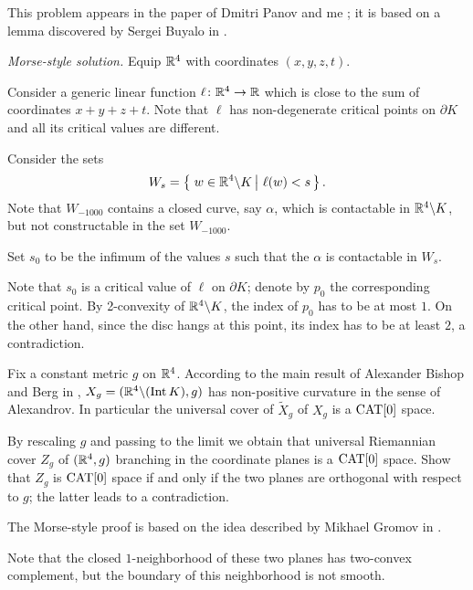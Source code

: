 This problem appears in the paper of Dmitri Panov and me \cite[see][]{panov-petrunin}; 
it is based on a lemma discovered by Sergei Buyalo in \cite{buyalo}.

\textit{Morse-style solution.}
Equip $\mathbb{R}^4$ with coordinates $(x,y,z,t)$.

Consider a generic linear function $\ell\colon\mathbb{R}^4\to\mathbb{R}$
which is close to the sum of coordinates $x+y+z+t$.
Note that $\ell$
has non-degenerate critical points on $\partial K$ and all its critical values are different.

Consider the sets 
$$W_s=\set{w\in \RR^4\backslash K}{\ell(w)<s}.$$
Note that $W_{-1000}$ contains a closed curve, say $\alpha$, 
which is contactable in $\mathbb{R}^4\backslash K$, 
but not constructable in the set $W_{-1000}$.

Set $s_0$ to be the infimum of the values $s$ such that
the $\alpha$ is contactable in $W_s$.

Note that $s_0$ is a critical value of $\ell$ on $\partial K$;
denote by $p_0$ the corresponding critical point.
By 2-convexity of $\mathbb{R}^4\backslash K$,
the index of $p_0$ has to be at most $1$.
On the other hand, since the disc hangs at this point,
its index has to be at least $2$,
 a contradiction.\qeds

Fix a constant metric $g$ on $\mathbb{R}^4$.
According to the main result of Alexander Bishop and Berg in \cite{ABB}, $X_g\z=(\RR^4\backslash (\Int K),g)$ has non-positive curvature in the sense of Alexandrov.
In particular the universal cover of $\tilde X_g$ of $X_g$ is a $\operatorname{\rm CAT}\nolimits[0]$ space.

By rescaling $g$ and passing to the limit we obtain that universal Riemannian cover $Z_g$ of $(\mathbb{R}^4,g)$ branching in the coordinate planes is a $\operatorname{\rm CAT}\nolimits[0]$ space.
Show that $Z_g$ is $\operatorname{\rm CAT}\nolimits[0]$ space if and only if the two planes are orthogonal with respect to $g$;
the latter leads to a contradiction.\qeds

The Morse-style proof is based on the idea described by Mikhael Gromov in \cite[][\S\textonehalf]{gromov-SGMC}.

Note that the closed $1$-neighborhood of these two planes has two-convex complement, but the boundary of this neighborhood is not smooth.